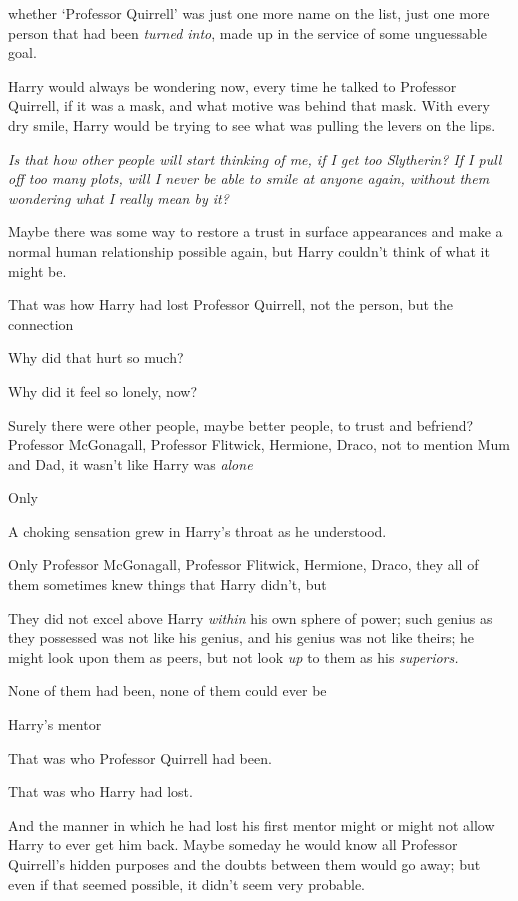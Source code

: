 {\el} whether `Professor Quirrell' was just one more name on the list, just
one more person that had been \emph{turned into}, made up in the service of
some unguessable goal.

Harry would always be wondering now, every time he talked to Professor
Quirrell, if it was a mask, and what motive was behind that mask. With every
dry smile, Harry would be trying to see what was pulling the levers on the lips.

\emph{Is that how other people will start thinking of me, if I get too
Slytherin? If I pull off too many plots, will I never be able to smile at
anyone again, without them wondering what I really mean by it?}

Maybe there was some way to restore a trust in surface appearances and make a
normal human relationship possible again, but Harry couldn't think of what it
might be.

That was how Harry had lost Professor Quirrell, not the person, but the{\el}
connection{\el}

Why did that hurt so much?

Why did it feel so lonely, now?

Surely there were other people, maybe better people, to trust and befriend?
Professor McGonagall, Professor Flitwick, Hermione, Draco, not to mention Mum
and Dad, it wasn't like Harry was \emph{alone{\el}}

Only{\el}

A choking sensation grew in Harry's throat as he understood.

Only Professor McGonagall, Professor Flitwick, Hermione, Draco, they all of
them sometimes knew things that Harry didn't, but{\el}

They did not excel above Harry \emph{within} his own sphere of power; such
genius as they possessed was not like his genius, and his genius was not like
theirs; he might look upon them as peers, but not look \emph{up} to them as his
\emph{superiors.}

None of them had been, none of them could ever be{\el}

Harry's mentor{\el}

That was who Professor Quirrell had been.

That was who Harry had lost.

And the manner in which he had lost his first mentor might or might not allow
Harry to ever get him back. Maybe someday he would know all Professor
Quirrell's hidden purposes and the doubts between them would go away; but even
if that seemed possible, it didn't seem very probable.

